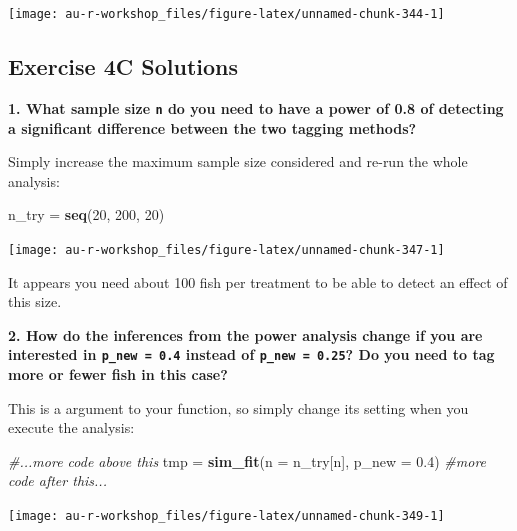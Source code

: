 \documentclass[]{book}
\newenvironment{Shaded}{\begin{snugshade}}{\end{snugshade}}
\newcommand{\KeywordTok}[1]{\textcolor[rgb]{0.13,0.29,0.53}{\textbf{#1}}}
\newcommand{\DataTypeTok}[1]{\textcolor[rgb]{0.13,0.29,0.53}{#1}}
\newcommand{\DecValTok}[1]{\textcolor[rgb]{0.00,0.00,0.81}{#1}}
\newcommand{\FloatTok}[1]{\textcolor[rgb]{0.00,0.00,0.81}{#1}}
\newcommand{\StringTok}[1]{\textcolor[rgb]{0.31,0.60,0.02}{#1}}
\newcommand{\CommentTok}[1]{\textcolor[rgb]{0.56,0.35,0.01}{\textit{#1}}}
\newcommand{\NormalTok}[1]{#1}
\theoremstyle{definition}
\theoremstyle{definition}
\theoremstyle{definition}
\theoremstyle{remark}
\begin{document}
\begin{center}\texttt{[image: au-r-workshop\_files/figure-latex/unnamed-chunk-344-1]} \end{center}

\hypertarget{ex4c-answers}{\subsection*{Exercise 4C
Solutions}\label{ex4c-answers}}

\textbf{1. What sample size \texttt{n} do you need to have a power of
0.8 of detecting a significant difference between the two tagging
methods?}

Simply increase the maximum sample size considered and re-run the whole
analysis:

\begin{Shaded}
\begin{Highlighting}[]
\NormalTok{n_try =}\StringTok{ }\KeywordTok{seq}\NormalTok{(}\DecValTok{20}\NormalTok{, }\DecValTok{200}\NormalTok{, }\DecValTok{20}\NormalTok{)}
\end{Highlighting}
\end{Shaded}

\begin{center}\texttt{[image: au-r-workshop\_files/figure-latex/unnamed-chunk-347-1]} \end{center}

It appears you need about 100 fish per treatment to be able to detect an
effect of this size.

\textbf{2. How do the inferences from the power analysis change if you
are interested in \texttt{p\_new\ =\ 0.4} instead of
\texttt{p\_new\ =\ 0.25}? Do you need to tag more or fewer fish in this
case?}

This is a argument to your function, so simply change its setting when
you execute the analysis:

\begin{Shaded}
\begin{Highlighting}[]
\CommentTok{#...more code above this}
\NormalTok{tmp =}\StringTok{ }\KeywordTok{sim_fit}\NormalTok{(}\DataTypeTok{n =}\NormalTok{ n_try[n], }\DataTypeTok{p_new =} \FloatTok{0.4}\NormalTok{)}
\CommentTok{#more code after this...}
\end{Highlighting}
\end{Shaded}

\begin{center}\texttt{[image: au-r-workshop\_files/figure-latex/unnamed-chunk-349-1]} \end{center}
\end{document}
